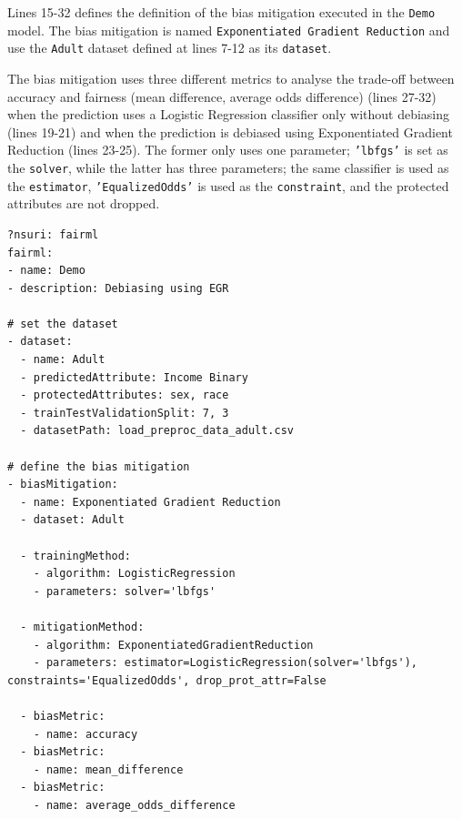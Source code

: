 \documentclass[sigconf]{acmart}
\begin{document}
{		Lines 15-32 defines the definition of the bias mitigation executed in the \texttt{Demo} model. The bias mitigation is named \texttt{Exponentiated Gradient Reduction} and use the \texttt{Adult} dataset defined at lines 7-12 as its \texttt{dataset}. 
		
		The bias mitigation uses three different metrics to analyse the trade-off between accuracy and fairness (mean difference, average odds difference) (lines 27-32) when the prediction uses a Logistic Regression classifier only without debiasing (lines 19-21) and when the prediction is debiased using Exponentiated Gradient Reduction (lines 23-25). The former only uses one parameter; \texttt{'lbfgs'} is set as the \texttt{solver}, while the latter has three parameters; the same classifier is used as the \texttt{estimator}, \texttt{'EqualizedOdds'} is used as the \texttt{constraint}, and the protected attributes are not dropped.
		
\begin{lstlisting}[firstnumber=1,style=yaml,caption={Bias mitigation using  Demo Exponentiated Gradient Reduction  expressed in YAML.},label=lst:fairml_model]
?nsuri: fairml
fairml:
- name: Demo
- description: Debiasing using EGR

# set the dataset
- dataset:
  - name: Adult
  - predictedAttribute: Income Binary
  - protectedAttributes: sex, race
  - trainTestValidationSplit: 7, 3
  - datasetPath: load_preproc_data_adult.csv

# define the bias mitigation
- biasMitigation:
  - name: Exponentiated Gradient Reduction  
  - dataset: Adult

  - trainingMethod:
    - algorithm: LogisticRegression
    - parameters: solver='lbfgs'

  - mitigationMethod:
    - algorithm: ExponentiatedGradientReduction
    - parameters: estimator=LogisticRegression(solver='lbfgs'), constraints='EqualizedOdds', drop_prot_attr=False

  - biasMetric:
    - name: accuracy
  - biasMetric:
    - name: mean_difference
  - biasMetric:
    - name: average_odds_difference
\end{lstlisting}
		
}
\end{document}
